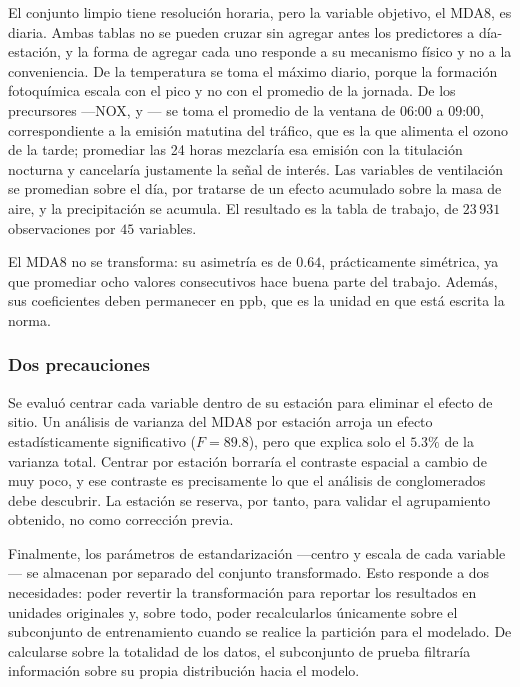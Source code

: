 El conjunto limpio tiene resolución horaria, pero la variable objetivo, el MDA8,
es diaria. Ambas tablas no se pueden cruzar sin agregar antes los predictores a
día-estación, y la forma de agregar cada uno responde a su mecanismo físico y no
a la conveniencia. De la temperatura se toma el máximo diario, porque la
formación fotoquímica escala con el pico y no con el promedio de la jornada. De
los precursores ---NOX,  y --- se toma el promedio de la ventana
de 06:00 a 09:00, correspondiente a la emisión matutina del tráfico, que es la
que alimenta el ozono de la tarde; promediar las 24 horas mezclaría esa
emisión con la titulación nocturna y cancelaría justamente la señal de interés.
Las variables de ventilación se promedian sobre el día, por tratarse de un efecto
acumulado sobre la masa de aire, y la precipitación se acumula. El resultado es la
tabla de trabajo, de $23\,931$ observaciones por $45$ variables.

El MDA8 no se transforma: su asimetría es de $0.64$, prácticamente simétrica, ya
que promediar ocho valores consecutivos hace buena parte del trabajo. Además, sus
coeficientes deben permanecer en ppb, que es la unidad en que está escrita la
norma.

\subsubsection*{Dos precauciones}

Se evaluó centrar cada variable dentro de su estación para eliminar el efecto de
sitio. Un análisis de varianza del MDA8 por estación arroja un efecto
estadísticamente significativo ($F=89.8$), pero que explica solo el $5.3\%$ de la
varianza total. Centrar por estación borraría el contraste espacial a cambio de
muy poco, y ese contraste es precisamente lo que el análisis de conglomerados
debe descubrir. La estación se reserva, por tanto, para validar el agrupamiento
obtenido, no como corrección previa.

Finalmente, los parámetros de estandarización ---centro y escala de cada
variable--- se almacenan por separado del conjunto transformado. Esto responde a
dos necesidades: poder revertir la transformación para reportar los resultados en
unidades originales y, sobre todo, poder recalcularlos únicamente sobre el
subconjunto de entrenamiento cuando se realice la partición para el modelado. De
calcularse sobre la totalidad de los datos, el subconjunto de prueba filtraría
información sobre su propia distribución hacia el modelo.
